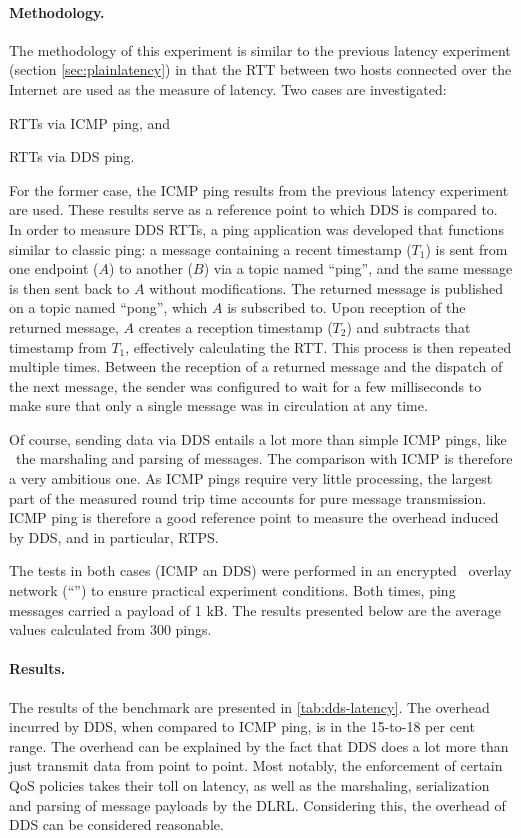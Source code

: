 \paragraph{Methodology.} The methodology of this experiment is similar to the previous latency experiment (section \ref{sec:plainlatency}) in that the RTT between two hosts connected over the Internet are used as the measure of latency. Two cases are investigated: 
\begin{inparaenum}[(i)]
	\item RTTs via ICMP ping, and
	\item RTTs via DDS ping.
\end{inparaenum}
For the former case, the ICMP ping results from the previous latency experiment are used. These results serve as a reference point to which DDS is compared to. In order to measure DDS RTTs, a ping application was developed that functions similar to classic ping: a message containing a recent timestamp ($T_1$) is sent from one endpoint ($A$) to another ($B$) via a topic named ``ping'', and the same message is then sent back to $A$ without modifications. The returned message is published on a topic named ``pong'', which $A$ is subscribed to. Upon reception of the returned message, $A$ creates a reception timestamp ($T_2$) and subtracts that timestamp from $T_1$, effectively calculating the RTT. This process is then repeated multiple times. Between the reception of a returned message and the dispatch of the next message, the sender was configured to wait for a few milliseconds to make sure that only a single message was in circulation at any time.

Of course, sending data via DDS entails a lot more than simple ICMP pings, like \eg\ the marshaling and parsing of messages. The comparison with ICMP is therefore a very ambitious one. As ICMP pings require very little processing, the largest part of the measured round trip time accounts for pure message transmission. ICMP ping is therefore a good reference point to measure the overhead induced by DDS, and in particular, RTPS. 

The tests in both cases (ICMP an DDS) were performed in an encrypted \wnet\ overlay network (``'') to ensure practical experiment conditions. Both times, ping messages carried a payload of 1 kB. The results presented below are the average values calculated from 300 pings.


\paragraph{Results.} 
The results of the benchmark are presented in \autoref{tab:dds-latency}. The overhead incurred by DDS, when compared to ICMP ping, is in the 15-to-18 per cent range. The overhead can be explained by the fact that DDS does a lot more than just transmit data from point to point. Most notably, the enforcement of certain QoS policies takes their toll on latency, as well as the marshaling, serialization and parsing of message payloads by the DLRL. Considering this, the overhead of DDS can be considered reasonable.

